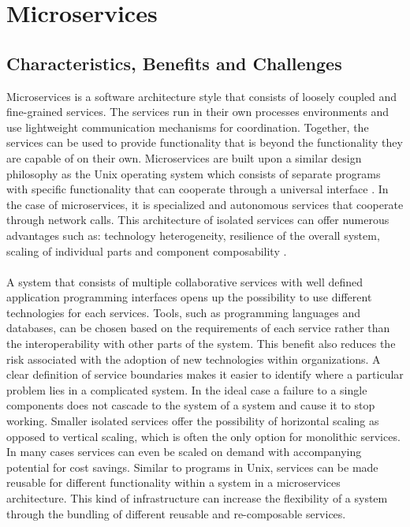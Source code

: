 \chapter{Microservices}
\label{chapter:microservices}

\section{Characteristics, Benefits and Challenges}

Microservices is a software architecture style that consists of loosely coupled and fine-grained services. The services run in their own processes environments and use lightweight communication mechanisms for coordination. Together, the services can be used to provide functionality that is beyond the functionality they are capable of on their own. Microservices are built upon a similar design philosophy as the Unix operating system which consists of separate programs with specific functionality that can cooperate through a universal interface \cite{raymond2003art}. In the case of microservices, it is specialized and autonomous services that cooperate through network calls. This architecture of isolated services can offer numerous advantages such as: technology heterogeneity, resilience of the overall system, scaling of individual parts and component composability \cite{newman2015building}.
\\ \\
A system that consists of multiple collaborative services with well defined application programming interfaces opens up the possibility to use different technologies for each services. Tools, such as programming languages and databases, can be chosen based on the requirements of each service rather than the interoperability with other parts of the system. This benefit also reduces the risk associated with the adoption of new technologies within organizations. A clear definition of service boundaries makes it easier to identify where a particular problem lies in a complicated system. In the ideal case a failure to a single components does not cascade to the system of a system and cause it to stop working. Smaller isolated services offer the possibility of horizontal scaling as opposed to vertical scaling, which is often the only option for monolithic services. In many cases services can even be scaled on demand with accompanying potential for cost savings. Similar to programs in Unix, services can be made reusable for different functionality within a system in a microservices architecture. This kind of infrastructure can increase the flexibility of a system through the bundling of different reusable and re-composable services.
